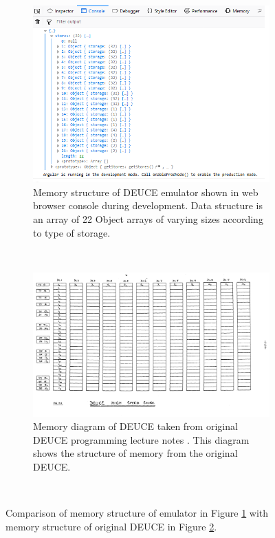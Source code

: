 \documentclass{l4proj}
\begin{document}
\begin{figure}[h]
	\centering
	\begin{subfigure}[t]{0.45\textwidth}
		\includegraphics[width=\textwidth]{images/memory-emu}
		\caption{Memory structure of DEUCE emulator shown in web browser console during development. Data structure is an array of 22 Object arrays of varying sizes according to type of storage.}
		\label{fig:memory-emu}
	\end{subfigure}
	~ %
	\begin{subfigure}[t]{0.45\textwidth}
		\includegraphics[width=\textwidth]{images/memory-real}
		\caption{Memory diagram of DEUCE taken from original DEUCE programming lecture notes \citep{tnmoc18}. This diagram shows the structure of memory from the original DEUCE.}
		\label{fig:memory-real}
	\end{subfigure}
	~ %
	\caption{Comparison of memory structure of emulator in Figure \ref{fig:memory-emu} with memory structure of original DEUCE in Figure \ref{fig:memory-real}.}
	\label{fig:memory-banks}
\end{figure}
\end{document}
